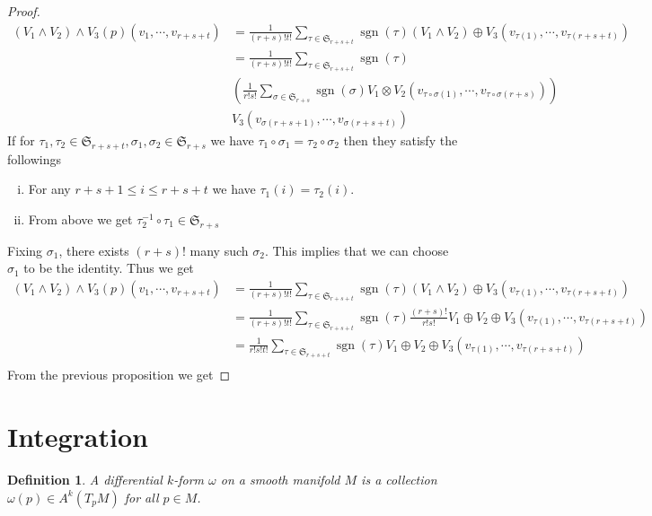 \documentclass{article}
\newtheorem{definition}{Definition}[section]
\numberwithin{equation}{section}
\DeclareMathOperator{\sgn}{sgn}
\begin{document}
\begin{proof}
\begin{align*}
(V_1\wedge V_2)\wedge V_3(p)(v_1,\cdots,v_{r+s+t})& = {\frac 1 {(r+s)!t!}}\sum_{\tau\in\mathfrak{S}_{r+s+t}}\sgn(\tau)(V_1\wedge V_2)\oplus V_3(v_{\tau(1)},\cdots,v_{\tau(r+s+t)})\\
&={\frac 1 {(r+s)!t!}}\sum_{\tau\in\mathfrak{S}_{r+s+t}}\sgn(\tau)\\
&({\frac 1 {r!s!}}\sum_{\sigma\in\mathfrak{S}_{r+s}}\sgn(\sigma)V_1\otimes V_2(v_{\tau\circ\sigma(1)},\cdots,v_{\tau\circ\sigma(r+s)}))\\
&V_3(v_{\sigma(r+s+1)},\cdots,v_{\sigma(r+s+t)})
\end{align*}
If for $\tau_1,\tau_2\in\mathfrak{S}_{r+s+t},\sigma_1,\sigma_2\in\mathfrak{S}_{r+s}$ we have $\tau_1\circ\sigma_1=\tau_2\circ\sigma_2$ then they satisfy the followings 
\begin{enumerate}[i.]
\item For any $r+s+1\leq i \leq r+s+t$ we have $\tau_1(i)=\tau_2(i)$.
\item From above we get $\tau_2^{-1}\circ\tau_1\in\mathfrak{S}_{r+s}$
\end{enumerate}
Fixing $\sigma_1$, there exists $(r+s)!$ many such $\sigma_2$. This implies that we can choose $\sigma_1$ to be the identity. Thus we get
\begin{align*}
(V_1\wedge V_2)\wedge V_3(p)(v_1,\cdots,v_{r+s+t})& = {\frac 1 {(r+s)!t!}}\sum_{\tau\in\mathfrak{S}_{r+s+t}}\sgn(\tau)(V_1\wedge V_2)\oplus V_3(v_{\tau(1)},\cdots,v_{\tau(r+s+t)})\\
&={\frac 1 {(r+s)!t!}}\sum_{\tau\in\mathfrak{S}_{r+s+t}}\sgn(\tau){\frac {(r+s)!} {r!s!}}V_1\oplus V_2\oplus V_3(v_{\tau(1)},\cdots,v_{\tau(r+s+t)})\\
& = {\frac 1 {r!s!t!}}\sum_{\tau\in\mathfrak{S}_{r+s+t}}\sgn(\tau)V_1\oplus V_2\oplus V_3(v_{\tau(1)},\cdots,v_{\tau(r+s+t)})\\
\end{align*}
From the previous proposition we get
\end{proof}

\section{Integration}

\begin{definition}
A differential $k$-form $\omega$ on a smooth manifold $M$ is a collection $\omega(p)\in A^k(T_pM)$ for all $p\in M$. 
\end{definition}
\end{document}
